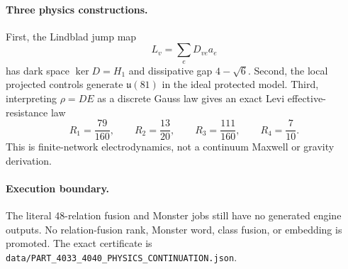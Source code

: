 \paragraph{Three physics constructions.}
First, the Lindblad jump map
\[
L_v=\sum_eD_{ve}a_e
\]
has dark space \(\ker D=H_1\) and dissipative gap \(4-\sqrt6\).  Second, the local projected controls generate \(\mathfrak u(81)\) in the ideal protected model.  Third, interpreting \(\rho=DE\) as a discrete Gauss law gives an exact Levi effective-resistance law
\[
R_1=\frac{79}{160},\qquad
R_2=\frac{13}{20},\qquad
R_3=\frac{111}{160},\qquad
R_4=\frac7{10}.
\]
This is finite-network electrodynamics, not a continuum Maxwell or gravity derivation.

\paragraph{Execution boundary.}
The literal 48-relation fusion and Monster jobs still have no generated engine outputs.  No relation-fusion rank, Monster word, class fusion, or embedding is promoted.  The exact certificate is
\texttt{data/PART\_4033\_4040\_PHYSICS\_CONTINUATION.json}.
